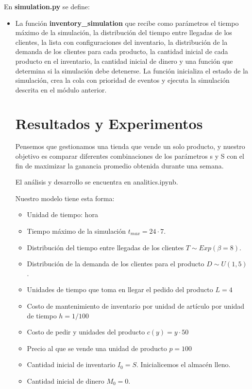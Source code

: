 \documentclass{article}
\begin{document}
En \textbf{simulation.py} se define:

\begin{itemize}
    \item La función \textbf{inventory\_simulation} que recibe como parámetros el tiempo máximo de la simulación, la distribución del
  tiempo entre llegadas de los clientes, la lista con configuraciones del inventario, la distribución de la demanda de
  los clientes
  para cada producto, la cantidad inicial de cada producto en el inventario, la cantidad inicial de dinero y una función
  que determina si
  la simulación debe detenerse.
  La función inicializa el estado de la simulación, crea la cola con prioridad de eventos y ejecuta la
  simulación descrita en el módulo anterior.


\section*{Resultados y Experimentos}

Pensemos que gestionamos una tienda que vende un solo producto, y nuestro objetivo es comparar diferentes combinaciones de los parámetros s y S con el fin de maximizar la ganancia promedio obtenida durante una semana.

\vspace{\baselineskip}

El análisis y desarrollo se encuentra en analitics.ipynb.

\vspace{\baselineskip}

Nuestro modelo tiene esta forma:
\begin{itemize}
    \item Unidad de tiempo: hora
    \item  Tiempo máximo de la simulación $t_{max} = 24 \cdot 7$.
    \item  Distribución del tiempo entre llegadas de los clientes $T \sim Exp(\beta = 8)$.
    \item  Distribución de la demanda de los clientes para el producto $D \sim U(1,5)$.
    \item Unidades de tiempo que toma en llegar el pedido del producto $L = 4$
    \item Costo de mantenimiento de inventario por unidad de artículo por unidad de tiempo $h=1/100$
    \item Costo de pedir y unidades del producto $c(y) = y \cdot 50$
    \item Precio al que se vende una unidad de producto $p = 100$
    \item Cantidad inicial de inventario $I_0 = S$. Inicialicemos el almacén lleno.
    \item Cantidad inicial de dinero $M_0 = 0$.
\end{itemize}


\end{itemize}
\end{document}
